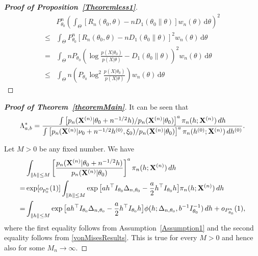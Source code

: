 \documentclass[11pt]{article}
\theoremstyle{plain}
\theoremstyle{definition}
\theoremstyle{remark}
\begin{document}
\begin{appendices}
\begin{proof}[\textbf{Proof of Proposition~\ref{Theoremless1}}]
\begin{align*}
    &
    P_{\theta_0}^n
    \left( 
\int_{\Theta}
     \left[    R_n(\theta_0, \theta) - n D_1 (\theta_0 \| \theta )  \right]
    w_n (\theta) \, \mathrm d \theta
    \right)^2
    \\
    \leq&
\int_{\Theta}
    P_{\theta_0}^n
     \left[    R_n(\theta_0, \theta) - n D_1 (\theta_0 \| \theta )  \right]^2
    w_n (\theta) \, \mathrm d \theta
    \\
    =&
\int_{\Theta}
n P_{\theta_0} \left(  \log \frac{p(X | \theta_0)}{p(X | \theta)} - D_1 (\theta_0 \| \theta) \right)^2
    w_n (\theta) \, \mathrm d \theta
    \\
    \leq &
\int_{\Theta}
n \left( P_{\theta_0}   \log^2 \frac{p(X | \theta_0)}{p(X | \theta)} \right)
    w_n (\theta) \, \mathrm d \theta
\end{align*}


    

\end{proof}



\begin{proof}[\textbf{Proof of Theorem~\ref{theoremMain}}]
    It can be seen that
    \begin{equation*}
        \Lambda_{a,b}^*=\frac{
    \int \left[{p_n(\mathbf{X}^{(n)}|\theta_0+n^{-1/2}h)}/{p_n(\mathbf{X}^{(n)}|\theta_0)}\right]^a \pi_n (h;\mathbf{X}^{(n)}) \, dh
        }{
    \int \left[ {p_n(\mathbf{X}^{(n)}|\nu_0+n^{-1/2}h^{(0)},\xi_0)}/{p_n(\mathbf{X}^{(n)}|\theta_0)}\right]^a \pi_n (h^{(0)};\mathbf{X}^{(n)}) \, dh^{(0)}
}.
    \end{equation*}


    Let $M>0$ be any fixed number.
    We have
\begin{equation}\label{eq:8}
    \begin{split}
    &\int_{\|h\|\leq M} \left[\frac{p_n(\mathbf{X}^{(n)}|\theta_0+n^{-1/2}h)}{p_n(\mathbf{X}^{(n)}|\theta_0)}\right]^a \pi_n (h;\mathbf{X}^{(n)}) \, dh\\
    =&
    \exp [o_{p^n_0}(1)]\int_{\|h\|\leq M} \exp\big[ a h^\top  I_{\theta_0}\Delta_{n,\theta_0}- \frac{a}{2}h^\top  I_{\theta_0}h\big]\pi_n (h;\mathbf{X}^{(n)}) \, dh
    \\
    =&\int_{\|h\|\leq M} \exp\big[ a h^\top  I_{\theta_0}\Delta_{n,\theta_0}-\frac{a}{2}h^\top  I_{\theta_0}h\big] \phi(h;\Delta_{n,\theta_0}, b^{-1} I_{\theta_0}^{-1})\, dh
    +o_{P^n_{\theta_0}}(1),
\end{split}
\end{equation}
where the first equality follows from Assumption~\ref{Assumption1} and the second equality follows from \eqref{vonMisesResults}.
This is true for every $M>0$ and hence also for some $M_n\to \infty$.


\end{proof}
\end{appendices}
\end{document}
